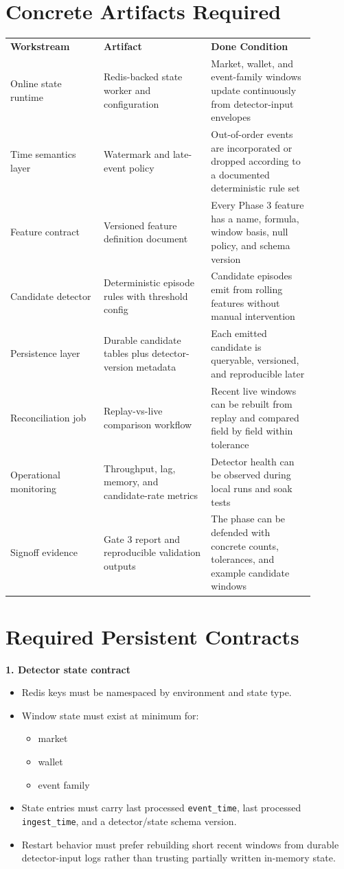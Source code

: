 \documentclass{article}
\begin{document}
\section*{Concrete Artifacts Required}
\begin{longtable}{p{0.27\linewidth}p{0.31\linewidth}p{0.30\linewidth}}
\textbf{Workstream} & \textbf{Artifact} & \textbf{Done Condition} \\
Online state runtime & Redis-backed state worker and configuration & Market, wallet, and event-family windows update continuously from detector-input envelopes \\
Time semantics layer & Watermark and late-event policy & Out-of-order events are incorporated or dropped according to a documented deterministic rule set \\
Feature contract & Versioned feature definition document & Every Phase 3 feature has a name, formula, window basis, null policy, and schema version \\
Candidate detector & Deterministic episode rules with threshold config & Candidate episodes emit from rolling features without manual intervention \\
Persistence layer & Durable candidate tables plus detector-version metadata & Each emitted candidate is queryable, versioned, and reproducible later \\
Reconciliation job & Replay-vs-live comparison workflow & Recent live windows can be rebuilt from replay and compared field by field within tolerance \\
Operational monitoring & Throughput, lag, memory, and candidate-rate metrics & Detector health can be observed during local runs and soak tests \\
Signoff evidence & Gate 3 report and reproducible validation outputs & The phase can be defended with concrete counts, tolerances, and example candidate windows \\
\end{longtable}

\section*{Required Persistent Contracts}
\textbf{1. Detector state contract}
\begin{itemize}
\item Redis keys must be namespaced by environment and state type.
\item Window state must exist at minimum for:
\begin{itemize}
\item market
\item wallet
\item event family
\end{itemize}
\item State entries must carry last processed \texttt{event\_time}, last processed \texttt{ingest\_time}, and a detector/state schema version.
\item Restart behavior must prefer rebuilding short recent windows from durable detector-input logs rather than trusting partially written in-memory state.
\end{itemize}
\end{document}
